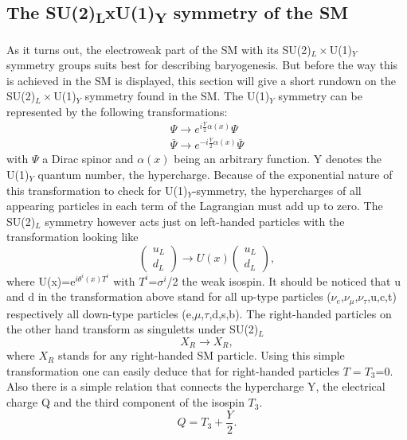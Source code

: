 \subsection{The SU(2)\textsubscript{L}xU(1)\textsubscript{Y} symmetry of the SM}
As it turns out, the electroweak part of the SM with its SU(2)$_L\times$U(1)$_Y$ symmetry groups suits best for describing baryogenesis. But before the way this is achieved in the SM is displayed, this section will give a short rundown on the SU(2)$_L\times$U(1)$_Y$ symmetry found in the SM.\newline\indent
The U(1)$_Y$ symmetry can be represented by the following transformations:
\begin{align*}
\Psi \longrightarrow e^{i\frac{Y}{2}\alpha(x)}\Psi\\
\bar{\Psi} \longrightarrow e^{-i\frac{Y}{2}\alpha(x)}\bar{\Psi}
\end{align*}
with $\Psi$ a Dirac spinor and $\alpha(x)$ being an arbitrary function. Y denotes the U(1)$_Y$ quantum number, the hypercharge. Because of the exponential nature of this transformation to check for U(1)$_Y$-symmetry, the hypercharges of all appearing particles in each term of the Lagrangian must add up to zero. \newline\indent
The SU(2)$_L$ symmetry however acts just on left-handed particles with the transformation looking like
\begin{equation*}
	\left(\begin{array}{c}u_L\\d_L\end{array}\right)\longrightarrow U(x)	\left(\begin{array}{c}u_L\\d_L\end{array}\right),
\end{equation*}
where U(x)=e$^{i\theta^i(x)T^i}$ with $T^i$=$\sigma^i$/2 the weak isospin. It should be noticed that u and d in the transformation above stand for all up-type particles ($\nu_e$,$\nu_\mu$,$\nu_\tau$,u,c,t) respectively all down-type particles (e,$\mu$,$\tau$,d,s,b). The right-handed particles on the other hand transform as singuletts under SU(2)$_L$
\begin{equation*}
	X_R\longrightarrow X_R,
\end{equation*}
where $X_R$ stands for any right-handed SM particle. Using this simple transformation one can easily deduce that for right-handed particles $T=T_3$=0.\newline\indent
Also there is a simple relation that connects the hypercharge Y, the electrical charge Q and the third component of the isospin $T_3$.
\begin{equation}
Q=T_3+\frac{Y}{2}
\label{eq:ladung_hyperladung_isospin}.
\end{equation}
